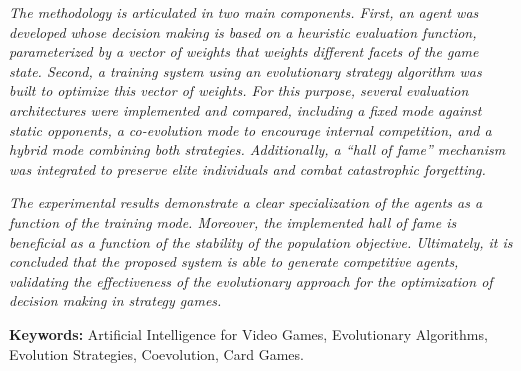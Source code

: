 \textit{The methodology is articulated in two main components. First, an agent was developed whose decision making is based on a heuristic evaluation function, parameterized by a vector of weights that weights different facets of the game state. Second, a training system using an evolutionary strategy algorithm was built to optimize this vector of weights. For this purpose, several evaluation architectures were implemented and compared, including a fixed mode against static opponents, a co-evolution mode to encourage internal competition, and a hybrid mode combining both strategies. Additionally, a ``hall of fame'' mechanism was integrated to preserve elite individuals and combat catastrophic forgetting.}

\textit{The experimental results demonstrate a clear specialization of the agents as a function of the training mode. Moreover, the implemented hall of fame is beneficial as a function of the stability of the population objective. Ultimately, it is concluded that the proposed system is able to generate competitive agents, validating the effectiveness of the evolutionary approach for the optimization of decision making in strategy games.}

\vspace{\baselineskip}
\noindent\textbf{Keywords:} Artificial Intelligence for Video Games, Evolutionary Algorithms, Evolution Strategies, Coevolution, Card Games.